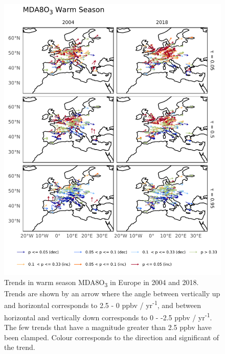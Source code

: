 \documentclass[journal abbreviation, manuscript]{copernicus}
\begin{document}
\begin{figure}[p]
\centering
\includegraphics[height=0.9\textheight]{figures/paper_figures/f09_o3_map_piecewise_stats_freeTau_mda8_anom_warm_eu_o3.pdf}
\caption{Trends in warm season MDA8O\textsubscript{3} in Europe in 2004 and 2018. Trends are shown by an arrow where the angle between vertically up and horizontal corresponds to 2.5 - 0 ppbv / yr\textsuperscript{-1}, and between horizontal and vertically down corresponds to 0 - -2.5 ppbv / yr\textsuperscript{-1}. The few trends that have a magnitude greater than 2.5 ppbv have been clamped. Colour corresponds to the direction and significant of the trend.}
\label{fig:o3_map_eu_mda8_warm}
\end{figure}
\clearpage
\end{document}
